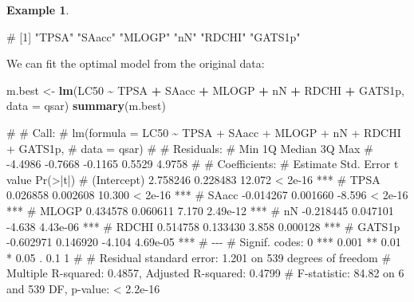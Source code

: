 \documentclass[
  a4paper,
]{article}
\newenvironment{Shaded}{\begin{snugshade}}{\end{snugshade}}
\newcommand{\AttributeTok}[1]{\textcolor[rgb]{0.13,0.29,0.53}{#1}}
\newcommand{\FunctionTok}[1]{\textcolor[rgb]{0.13,0.29,0.53}{\textbf{#1}}}
\newcommand{\NormalTok}[1]{#1}
\newcommand{\OtherTok}[1]{\textcolor[rgb]{0.56,0.35,0.01}{#1}}
\newcommand{\SpecialCharTok}[1]{\textcolor[rgb]{0.81,0.36,0.00}{\textbf{#1}}}
\theoremstyle{definition}
\theoremstyle{definition}
\newtheorem{example}{Example}[section]
\theoremstyle{definition}
\theoremstyle{definition}
\theoremstyle{remark}
\begin{document}
\begin{example}
\begin{Shaded}
\begin{Highlighting}[]
\NormalTok{\# [1] "TPSA"   "SAacc"  "MLOGP"  "nN"     "RDCHI"  "GATS1p"}
\end{Highlighting}
\end{Shaded}

We can fit the optimal model from the original data:

\begin{Shaded}
\begin{Highlighting}[]
\NormalTok{m.best }\OtherTok{\textless{}{-}} \FunctionTok{lm}\NormalTok{(LC50 }\SpecialCharTok{\textasciitilde{}}\NormalTok{ TPSA }\SpecialCharTok{+}\NormalTok{ SAacc }\SpecialCharTok{+}\NormalTok{ MLOGP }\SpecialCharTok{+}\NormalTok{ nN }\SpecialCharTok{+}\NormalTok{ RDCHI }\SpecialCharTok{+}\NormalTok{ GATS1p,}
             \AttributeTok{data =}\NormalTok{ qsar)}
\FunctionTok{summary}\NormalTok{(m.best)}
\end{Highlighting}
\end{Shaded}

\begin{Shaded}
\begin{Highlighting}[]
\NormalTok{\# }
\NormalTok{\# Call:}
\NormalTok{\# lm(formula = LC50 \textasciitilde{} TPSA + SAacc + MLOGP + nN + RDCHI + GATS1p, }
\NormalTok{\#     data = qsar)}
\NormalTok{\# }
\NormalTok{\# Residuals:}
\NormalTok{\#     Min      1Q  Median      3Q     Max }
\NormalTok{\# {-}4.4986 {-}0.7668 {-}0.1165  0.5529  4.9758 }
\NormalTok{\# }
\NormalTok{\# Coefficients:}
\NormalTok{\#              Estimate Std. Error t value Pr(\textgreater{}|t|)    }
\NormalTok{\# (Intercept)  2.758246   0.228483  12.072  \textless{} 2e{-}16 ***}
\NormalTok{\# TPSA         0.026858   0.002608  10.300  \textless{} 2e{-}16 ***}
\NormalTok{\# SAacc       {-}0.014267   0.001660  {-}8.596  \textless{} 2e{-}16 ***}
\NormalTok{\# MLOGP        0.434578   0.060611   7.170 2.49e{-}12 ***}
\NormalTok{\# nN          {-}0.218445   0.047101  {-}4.638 4.43e{-}06 ***}
\NormalTok{\# RDCHI        0.514758   0.133430   3.858 0.000128 ***}
\NormalTok{\# GATS1p      {-}0.602971   0.146920  {-}4.104 4.69e{-}05 ***}
\NormalTok{\# {-}{-}{-}}
\NormalTok{\# Signif. codes:  0 \textquotesingle{}***\textquotesingle{} 0.001 \textquotesingle{}**\textquotesingle{} 0.01 \textquotesingle{}*\textquotesingle{} 0.05 \textquotesingle{}.\textquotesingle{} 0.1 \textquotesingle{} \textquotesingle{} 1}
\NormalTok{\# }
\NormalTok{\# Residual standard error: 1.201 on 539 degrees of freedom}
\NormalTok{\# Multiple R{-}squared:  0.4857,  Adjusted R{-}squared:  0.4799 }
\NormalTok{\# F{-}statistic: 84.82 on 6 and 539 DF,  p{-}value: \textless{} 2.2e{-}16}
\end{Highlighting}
\end{Shaded}


\end{example}
\end{document}
